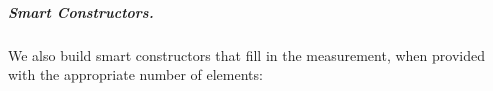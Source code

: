 \documentclass[12pt,twoside,notitlepage]{report}
\begin{document}
\subparagraph{Smart Constructors.}
We also build smart constructors that fill in the measurement, when provided with the appropriate number of elements:

\begin{code}
\\
\> \AgdaSymbol{:}  \AgdaSymbol{\{}\AgdaSymbol{\}} \AgdaSymbol{\{} \AgdaSymbol{:}  \AgdaSymbol{\}\{} \AgdaSymbol{:}   \AgdaSymbol{\}}\<%
\\
\>[0]\<[8]%
\>[8]  \AgdaSymbol{:}   \<%
\\
\>[0]\<[8]%
\>[8]  \AgdaSymbol{:}    \<%
\\
\>[0]\<[8]%
\>[8]       \<%
\\
\>   \AgdaSymbol{=}  \AgdaSymbol{(}      \AgdaSymbol{)}   \<%
\\
%
\\
\> \AgdaSymbol{:}  \AgdaSymbol{\{}\AgdaSymbol{\}} \AgdaSymbol{\{} \AgdaSymbol{:}  \AgdaSymbol{\}\{} \AgdaSymbol{:}   \AgdaSymbol{\}}\<%
\\
\>[0]\<[8]%
\>[8]  \AgdaSymbol{:}   \<%
\\
\>[0]\<[8]%
\>[8]  \AgdaSymbol{:}    \<%
\\
\>[0]\<[8]%
\>[8]         \<%
\\
\>    \AgdaSymbol{=}  \AgdaSymbol{(}          \AgdaSymbol{)}    \<%
\\
\end{code}
\end{document}
